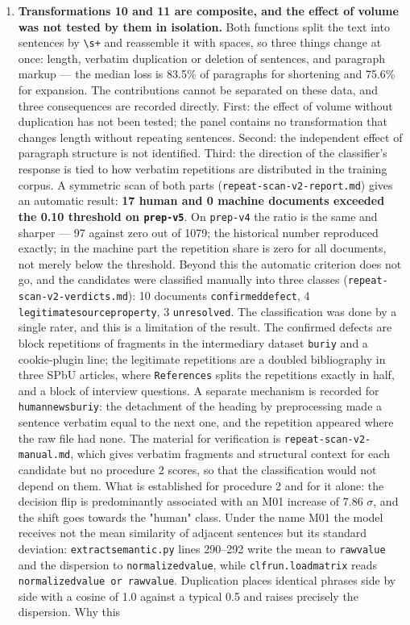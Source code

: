 \documentclass[11pt,a4paper]{article}
\renewcommand{\_}{\textunderscore\allowbreak}
\begin{document}
\begin{enumerate}
\item[25.] \textbf{Transformations 10 and 11 are composite, and the effect of volume was not tested by them in isolation.} Both functions split the text into sentences by \texttt{\textbackslash{}s+} and reassemble it with spaces, so three things change at once: length, verbatim duplication or deletion of sentences, and paragraph markup — the median loss is 83.5\% of paragraphs for shortening and 75.6\% for expansion. The contributions cannot be separated on these data, and three consequences are recorded directly. First: the effect of volume without duplication has not been tested; the panel contains no transformation that changes length without repeating sentences. Second: the independent effect of paragraph structure is not identified. Third: the direction of the classifier's response is tied to how verbatim repetitions are distributed in the training corpus. A symmetric scan of both parts (\texttt{repeat-\allowbreak{}scan-\allowbreak{}v2-\allowbreak{}report.md}) gives an automatic result: \textbf{17 human and 0 machine documents exceeded the 0.10 threshold on \texttt{prep-\allowbreak{}v5}}. On \texttt{prep-\allowbreak{}v4} the ratio is the same and sharper — 97 against zero out of 1079; the historical number reproduced exactly; in the machine part the repetition share is zero for all documents, not merely below the threshold. Beyond this the automatic criterion does not go, and the candidates were classified manually into three classes (\texttt{repeat-\allowbreak{}scan-\allowbreak{}v2-\allowbreak{}verdicts.md}): 10 documents \texttt{confirmed\_defect}, 4 \texttt{legitimate\_source\_property}, 3 \texttt{unresolved}. The classification was done by a single rater, and this is a limitation of the result. The confirmed defects are block repetitions of fragments in the intermediary dataset \texttt{buriy\_2014} and a cookie-plugin line; the legitimate repetitions are a doubled bibliography in three SPbU articles, where \texttt{References} splits the repetitions exactly in half, and a block of interview questions. A separate mechanism is recorded for \texttt{human\_news\_buriy\_2014\_0048}: the detachment of the heading by preprocessing made a sentence verbatim equal to the next one, and the repetition appeared where the raw file had none. The material for verification is \texttt{repeat-\allowbreak{}scan-\allowbreak{}v2-\allowbreak{}manual.md}, which gives verbatim fragments and structural context for each candidate but no procedure 2 scores, so that the classification would not depend on them. What is established for procedure 2 and for it alone: the decision flip is predominantly associated with an M01 increase of 7.86 $\sigma$, and the shift goes towards the "human" class. Under the name M01 the model receives not the mean similarity of adjacent sentences but its standard deviation: \texttt{extract\_semantic.py} lines 290–292 write the mean to \texttt{raw\_value} and the dispersion to \texttt{normalized\_value}, while \texttt{clf\_run.load\_matrix} reads \texttt{normalized\_value or raw\_value}. Duplication places identical phrases side by side with a cosine of 1.0 against a typical 0.5 and raises precisely the dispersion. Why this 
\end{enumerate}
\end{document}
